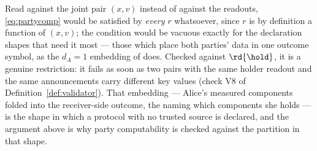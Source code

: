 
\begin{remark}
\label{rem:vacuous}
Read against the joint pair $(x,v)$ instead of against the readouts,
\eqref{eq:partycomp} would be satisfied by \emph{every} $r$ whatsoever, since
$r$ is by definition a function of $(x,v)$; the condition would be vacuous
exactly for the declaration shapes that need it most --- those which place both
parties' data in one outcome symbol, as the $d_A=1$ embedding of
 does. Checked against $\rd{\hold}$, it is a genuine
restriction: it fails as soon as two pairs with the same holder readout and the
same announcements carry different key values (check V8 of
Definition~\ref{def:validator}). That embedding --- Alice's measured
components folded into the receiver-side outcome, the 
naming which components she holds --- is the shape in which a protocol with no
trusted source is declared, and the argument above is why party computability
is checked against the partition in that shape.
\end{remark}
